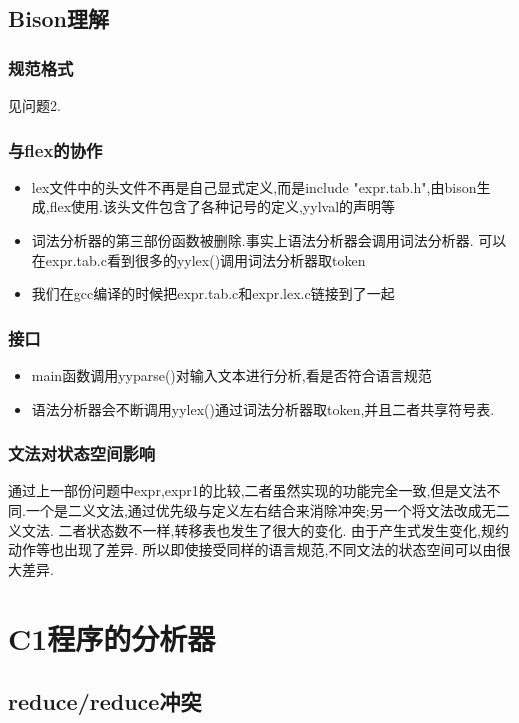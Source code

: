 \documentclass[11pt]{article}
\begin{document}
\subsection{Bison理解}
\label{sec-1-2}
\subsubsection{规范格式}
\label{sec-1-2-1}
见问题2.
\subsubsection{与flex的协作}
\label{sec-1-2-2}
\begin{itemize}
\item lex文件中的头文件不再是自己显式定义,而是include "expr.tab.h",由bison生成,flex使用.该头文件包含了各种记号的定义,yylval的声明等
\item 词法分析器的第三部份函数被删除.事实上语法分析器会调用词法分析器. 可以在expr.tab.c看到很多的yylex()调用词法分析器取token
\item 我们在gcc编译的时候把expr.tab.c和expr.lex.c链接到了一起
\end{itemize}
\subsubsection{接口}
\label{sec-1-2-3}
\begin{itemize}
\item main函数调用yyparse()对输入文本进行分析,看是否符合语言规范
\item 语法分析器会不断调用yylex()通过词法分析器取token,并且二者共享符号表.
\end{itemize}
\subsubsection{文法对状态空间影响}
\label{sec-1-2-4}
通过上一部份问题中expr,expr1的比较,二者虽然实现的功能完全一致,但是文法不同.一个是二义文法,通过优先级与定义左右结合来消除冲突;另一个将文法改成无二义文法. 二者状态数不一样,转移表也发生了很大的变化. 由于产生式发生变化,规约动作等也出现了差异. 所以即使接受同样的语言规范,不同文法的状态空间可以由很大差异.
\section{C1程序的分析器}
\label{sec-2}
\subsection{reduce/reduce冲突}
\label{sec-2-1}
\end{document}
